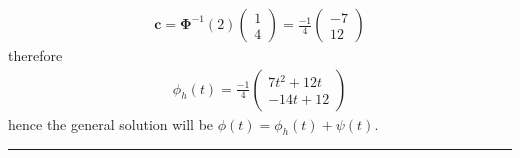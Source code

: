 \documentclass[12pt, letterpaper]{scrartcl}
\begin{document}
\begin{align*}
    \bm{c}=\bm\Phi^{-1}(2)\left( \begin{array}{c} 1 \\ 4\end{array}\right)=\frac{-1}{4}\left( \begin{array}{c} -7 \\ 12\end{array}\right)
\end{align*}
therefore
\begin{align*}
    \phi_h(t)=\frac{-1}{4}\left( \begin{array}{c} 7t^2+12t \\ -14t+12\end{array}\right)
\end{align*}
hence the general solution will be $\phi(t)=\phi_h(t)+\psi(t)$.
\vskip1mm\hrule
\end{document}
